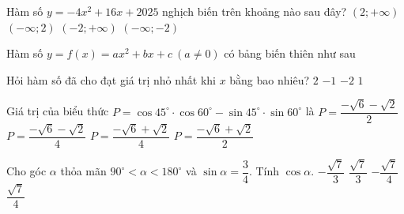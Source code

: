 \begin{ex}%
	Hàm số $y=-4x^2+16x+2025$ nghịch biến trên khoảng nào sau đây?
	\choice
	{\True$(2 ;+\infty)$}
	{$(-\infty ; 2)$}
	{$(-2 ;+\infty)$}
	{$(-\infty ;-2)$}
\end{ex}
\begin{ex}%
	Hàm số $y=f(x)=ax^2+ bx+c ~(a \neq 0)$ có bảng biến thiên như sau
	\begin{center}
	\end{center}
	Hỏi hàm số đã cho đạt giá trị nhỏ nhất khi $x$ bằng bao nhiêu?	
	\choice
	{\True $2$}
	{$-1$}
	{$-2$}
	{$1$}
\end{ex}
\begin{ex}%
	 Giá trị của biểu thức $P=\cos 45^\circ \cdot \cos 60^\circ-\sin 45^\circ \cdot \sin 60^\circ$ là
	\choice
	{$P=\dfrac{-\sqrt{6}-\sqrt{2}}{2}$}
	{$P=\dfrac{-\sqrt{6}-\sqrt{2}}{4}$}
	{\True$P=\dfrac{-\sqrt{6}+\sqrt{2}}{4}$}
	{$P=\dfrac{-\sqrt{6}+\sqrt{2}}{2}$}
\end{ex}
\begin{ex}%
	Cho góc $\alpha$ thỏa mãn $90^\circ<\alpha<180^\circ$ và $\sin \alpha=\dfrac{3}{4}$. Tính $\cos \alpha$.
	\choice
	{$-\dfrac{\sqrt{7}}{3}$}
	{$\dfrac{\sqrt{7}}{3}$}
	{\True$-\dfrac{\sqrt{7}}{4}$}
	{$\dfrac{\sqrt{7}}{4}$}
	
\end{ex}
